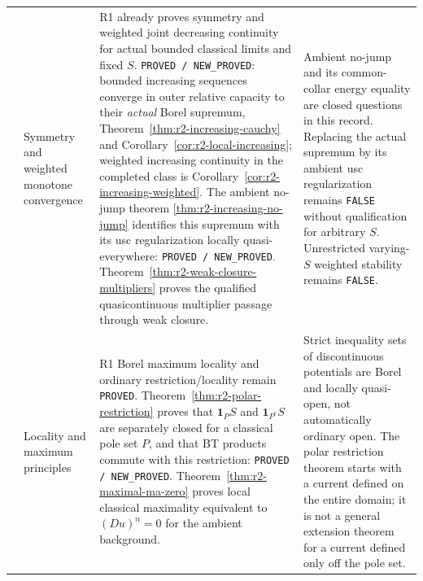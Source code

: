 \begin{longtable}{@{}>{\raggedright\arraybackslash}p{}>{\raggedright\arraybackslash}p{}>{\raggedright\arraybackslash}p{}>{\raggedright\arraybackslash}p{}@{}}
4 & Symmetry and weighted monotone convergence &
R1 already proves symmetry and weighted joint decreasing continuity
for actual bounded classical limits and fixed $S$.
\texttt{PROVED / NEW\_PROVED}: bounded increasing sequences converge
in outer relative capacity to their \emph{actual} Borel supremum,
Theorem~\ref{thm:r2-increasing-cauchy} and
Corollary~\ref{cor:r2-local-increasing}; weighted increasing continuity
in the completed class is Corollary~\ref{cor:r2-increasing-weighted}.
The ambient no-jump theorem
\ref{thm:r2-increasing-no-jump} identifies this supremum with its usc
regularization locally quasi-everywhere:
\texttt{PROVED / NEW\_PROVED}.
Theorem~\ref{thm:r2-weak-closure-multipliers} proves the qualified
quasicontinuous multiplier passage through weak closure. &
Ambient no-jump and its common-collar energy equality are closed
questions in this record. Replacing the actual supremum by its
ambient usc regularization remains \texttt{FALSE} without
qualification for arbitrary $S$. Unrestricted varying-$S$ weighted
stability remains \texttt{FALSE}.\\[5pt]

5 & Locality and maximum principles &
R1 Borel maximum locality and ordinary restriction/locality remain
\texttt{PROVED}. Theorem~\ref{thm:r2-polar-restriction} proves that
$\mathbf1_P S$ and $\mathbf1_{P^c}S$ are separately closed for a
classical pole set $P$, and that BT products commute with this
restriction: \texttt{PROVED / NEW\_PROVED}.
Theorem~\ref{thm:r2-maximal-ma-zero} proves local classical maximality
equivalent to $(Du)^n=0$ for the ambient background. &
Strict inequality sets of discontinuous potentials are Borel and
locally quasi-open, not automatically ordinary open. The polar
restriction theorem starts with a current defined on the entire
domain; it is not a general extension theorem for a current defined
only off the pole set.\\[5pt]


\end{longtable}

